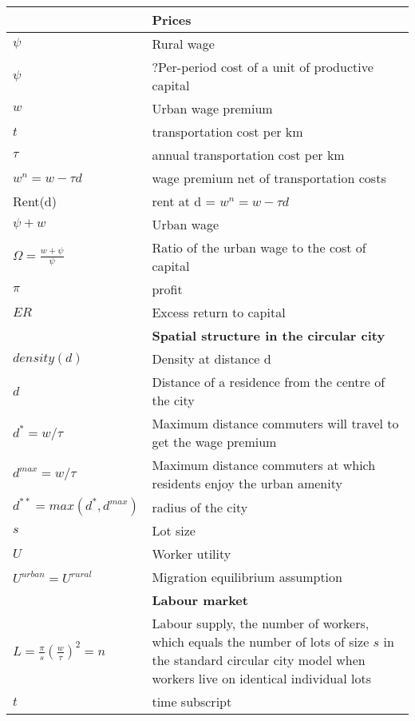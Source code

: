 \begin{longtable}{lp{10cm}}
		& \textbf{Prices}\\ \hline
$\psi$  &  Rural wage\\
$\psi$  &  ?Per-period cost of a unit of productive capital\\
$w$     &  Urban wage premium\\
$\textit{t}$ & {\color{red}transportation cost per km}\\
$\tau$  &  annual  transportation cost per km \\
$w^n=w-\tau d$ & wage  premium net of transportation costs\\
 {\color{red}Rent(d)}& rent  at d = $w^n=w-\tau d$\\ 
$\psi + w$  &  Urban wage\\
$\Omega=\frac{w+\psi}{\psi}$  &  Ratio of the urban wage to the  cost of capital\\
$\pi$	 & profit\\
$ER$	& Excess return to capital\\
\hline
		&\textbf{Spatial structure in the circular city}\\ \hline		
$density(d)$ & {\color{red}Density at distance d}\\
$d$  &  Distance of a residence from the centre of the city\\
$d^* = w/\tau$  &  Maximum distance commuters will travel to get the wage premium\\
$d^{max} = w/\tau$  &  Maximum distance commuters at which residents enjoy the urban amenity\\
$d^{**} = max(d^*, d^{max})$  &  radius of the city\\
$s$ & Lot size\\
$U$  &  Worker utility\\%
$U^{urban}=U^{rural} $  &   Migration equilibrium assumption\\
\hline
		& \textbf{Labour market}\\ \hline
$L= \frac{\pi}{s}(\frac{w}{\tau})^2 = n$  &  
Labour supply, the number of workers, which equals the number of lots of size $s$ in the standard circular city model when workers live on identical individual lots\\ %
\hline
{\color{red}$t$} &time subscript \\ \hline


\end{longtable}
